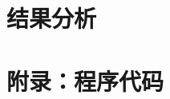 \documentclass[a4paper,11pt,openany,notitlepage]{book}
\begin{document}
\section{结果分析}



\section{附录：程序代码}
\begin{lstlisting}

\end{lstlisting}
\end{document}
